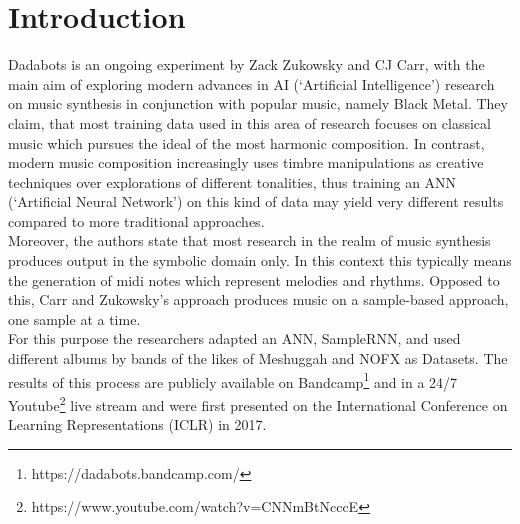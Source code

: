 \documentclass[a4paper, 11pt]{report}
\begin{document}
\chapter{Introduction}
Dadabots is an ongoing experiment by Zack Zukowsky and CJ Carr, with the main 
aim of exploring modern advances in AI (‘Artificial Intelligence’) research on 
music synthesis in conjunction with popular music, namely Black Metal. They 
claim, that most training data used in this area of research focuses on 
classical music which pursues the ideal of the most harmonic composition. 
In contrast, modern music composition increasingly uses timbre manipulations as 
creative techniques over explorations of different 
tonalities\cite{zukowski2018generating}, thus training an 
ANN (‘Artificial Neural Network’) on this kind of data may yield very different 
results compared to more traditional approaches. \\
Moreover, the authors state that most research in the realm of music synthesis 
produces output in the symbolic domain only\cite{zukowski2018generating}. In this context this typically means 
the generation of midi notes which represent melodies and rhythms. Opposed to 
this, Carr and Zukowsky’s approach produces music on a sample-based approach, 
one sample at a time\cite{mehri2016samplernn}\cite{zukowski2018generating}.  \\
For this purpose the researchers adapted an ANN, SampleRNN, and used different 
albums by bands of the likes of Meshuggah and NOFX as Datasets. The results of 
this process are publicly available on 
Bandcamp\footnote{ https://dadabots.bandcamp.com/ } and in a 24/7 
Youtube\footnote{https://www.youtube.com/watch?v=CNNmBtNcccE } live 
stream and were first presented on the International Conference on Learning 
Representations (ICLR) in 2017. 
\end{document}
